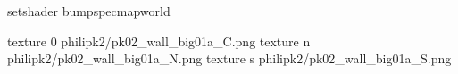 setshader bumpspecmapworld

texture 0 philipk2/pk02_wall_big01a_C.png
texture n philipk2/pk02_wall_big01a_N.png
texture s philipk2/pk02_wall_big01a_S.png

